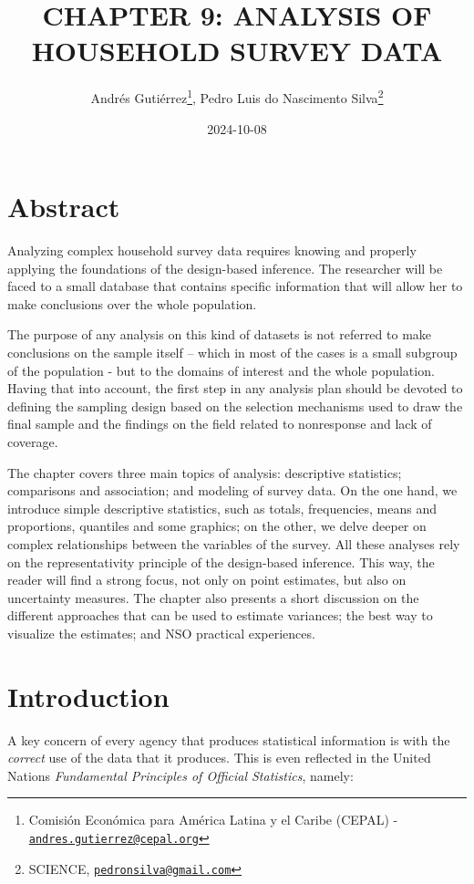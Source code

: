 \documentclass[
  12pt,
]{book}
\title{CHAPTER 9: ANALYSIS OF HOUSEHOLD SURVEY DATA}
\author{Andrés Gutiérrez\footnote{Comisión Económica para América Latina y el Caribe (CEPAL) - \href{mailto:andres.gutierrez@cepal.org}{\nolinkurl{andres.gutierrez@cepal.org}}}, Pedro Luis do Nascimento Silva\footnote{SCIENCE, \href{mailto:pedronsilva@gmail.com}{\nolinkurl{pedronsilva@gmail.com}}}}
\date{2024-10-08}
\begin{document}
\maketitle

{
\hypersetup{linkcolor=}
\setcounter{tocdepth}{0}
\tableofcontents
}
\listoffigures
\listoftables
\hypertarget{abstract}{%
\chapter*{Abstract}\label{abstract}}

Analyzing complex household survey data requires knowing and properly applying the foundations of the design-based inference. The researcher will be faced to a small database that contains specific information that will allow her to make conclusions over the whole population.

The purpose of any analysis on this kind of datasets is not referred to make conclusions on the sample itself -- which in most of the cases is a small subgroup of the population - but to the domains of interest and the whole population. Having that into account, the first step in any analysis plan should be devoted to defining the sampling design based on the selection mechanisms used to draw the final sample and the findings on the field related to nonresponse and lack of coverage.

The chapter covers three main topics of analysis: descriptive statistics; comparisons and association; and modeling of survey data. On the one hand, we introduce simple descriptive statistics, such as totals, frequencies, means and proportions, quantiles and some graphics; on the other, we delve deeper on complex relationships between the variables of the survey. All these analyses rely on the representativity principle of the design-based inference. This way, the reader will find a strong focus, not only on point estimates, but also on uncertainty measures. The chapter also presents a short discussion on the different approaches that can be used to estimate variances; the best way to visualize the estimates; and NSO practical experiences.

\hypertarget{introduction}{%
\chapter*{Introduction}\label{introduction}}

A key concern of every agency that produces statistical information is with the \emph{correct} use of the data that it produces. This is even reflected in the United Nations \emph{Fundamental Principles of Official Statistics}, namely:
\end{document}
